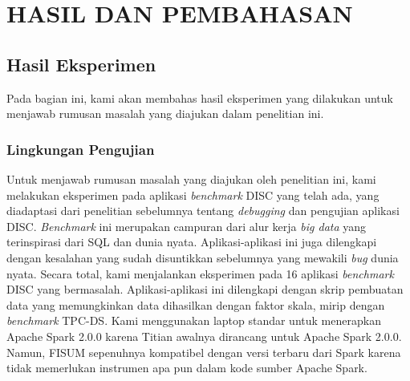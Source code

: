 \chapter{HASIL DAN PEMBAHASAN}
\label{chap:hasildanpembahasan}

\section{Hasil Eksperimen}
\label{sec:hasilpengujian}

Pada bagian ini, kami akan membahas hasil eksperimen yang dilakukan
untuk menjawab rumusan masalah yang diajukan dalam penelitian ini.

\subsection{Lingkungan Pengujian}
\label{subsec:lingkunganpengujian}

Untuk menjawab rumusan masalah yang diajukan oleh penelitian ini,
kami melakukan eksperimen pada aplikasi \emph{benchmark}
DISC yang telah ada, yang diadaptasi dari penelitian sebelumnya
tentang \emph{debugging} dan pengujian aplikasi DISC. \emph{Benchmark}
ini merupakan campuran dari alur kerja \emph{big data} yang
terinspirasi dari SQL dan dunia nyata. Aplikasi-aplikasi
ini juga dilengkapi dengan kesalahan yang sudah disuntikkan
sebelumnya yang mewakili \emph{bug} dunia nyata. Secara total,
kami menjalankan eksperimen pada 16 aplikasi \emph{benchmark}
DISC yang bermasalah. Aplikasi-aplikasi ini dilengkapi
dengan skrip pembuatan data yang memungkinkan data
dihasilkan dengan faktor skala, mirip dengan
\emph{benchmark} TPC-DS. Kami menggunakan laptop standar
untuk menerapkan Apache Spark 2.0.0 karena Titian
awalnya dirancang untuk Apache Spark 2.0.0. Namun,
FISUM sepenuhnya kompatibel dengan versi terbaru dari
Spark karena tidak memerlukan instrumen apa pun dalam
kode sumber Apache Spark. 

